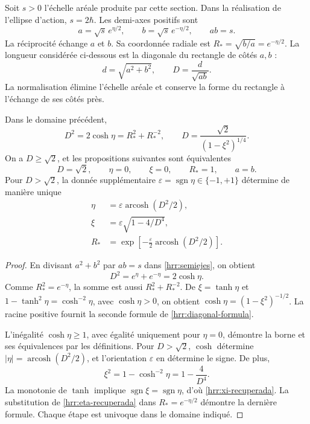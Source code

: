 Soit \(s>0\) l’échelle aréale produite par cette section. Dans la réalisation de l’ellipse d’action, \(s=2\hbar\). Les demi-axes positifs sont
\begin{equation}
 a=\sqrt{s}\,e^{\eta/2},\qquad
 b=\sqrt{s}\,e^{-\eta/2},\qquad ab=s.
 \label{hrr:semiejes}
\end{equation}
La réciprocité échange \(a\) et \(b\). Sa coordonnée radiale est \(R_*=\sqrt{b/a}=e^{-\eta/2}\). La longueur considérée ci-dessous est la diagonale du rectangle de côtés \(a,b\) :
\[
 d=\sqrt{a^2+b^2},\qquad D=\frac{d}{\sqrt{ab}}.
\]
La normalisation élimine l’échelle aréale et conserve la forme du rectangle à l’échange de ses côtés près.

\begin{theorem}
\label{hrr:diagonal-teorema} Dans le domaine précédent,
\begin{equation}
 D^2=2\cosh\eta=R_*^2+R_*^{-2},
 \qquad
 D=\frac{\sqrt2}{(1-\xi^2)^{1/4}}.
 \label{hrr:diagonal-formula}
\end{equation}
On a \(D\geq\sqrt2\), et les propositions suivantes sont équivalentes
\[
 D=\sqrt2,\qquad \eta=0,\qquad \xi=0,\qquad R_*=1,
 \qquad a=b.
\]
Pour \(D>\sqrt2\), la donnée supplémentaire \(\varepsilon=\operatorname{sgn}\eta\in\{-1,+1\}\) détermine de manière unique
\begin{align}
 \eta&=\varepsilon\operatorname{arcosh}(D^2/2),
 \label{hrr:eta-recuperada}\\
 \xi&=\varepsilon\sqrt{1-4/D^4},
 \label{hrr:xi-recuperada}\\
 R_*&=\exp\!\left[-\frac{\varepsilon}{2}
                   \operatorname{arcosh}(D^2/2)\right].
 \label{hrr:radio-recuperado}
\end{align}
\end{theorem}
\begin{proof}
En divisant \(a^2+b^2\) par \(ab=s\) dans \eqref{hrr:semiejes}, on obtient
\[
 D^2=e^{\eta}+e^{-\eta}=2\cosh\eta.
\]
Comme \(R_*^2=e^{-\eta}\), la somme est aussi \(R_*^2+R_*^{-2}\). De \(\xi=\tanh\eta\) et \(1-\tanh^2\eta=\cosh^{-2}\eta\), avec \(\cosh\eta>0\), on obtient \(\cosh\eta=(1-\xi^2)^{-1/2}\). La racine positive fournit la seconde formule de \eqref{hrr:diagonal-formula}.

L’inégalité \(\cosh\eta\geq1\), avec égalité uniquement pour \(\eta=0\), démontre la borne et ses équivalences par les définitions. Pour \(D>\sqrt2\), \(\cosh\) détermine \(|\eta|=\operatorname{arcosh}(D^2/2)\), et l’orientation \(\varepsilon\) en détermine le signe. De plus,
\[
 \xi^2=1-\cosh^{-2}\eta=1-\frac4{D^4}.
\]
La monotonie de \(\tanh\) implique \(\operatorname{sgn}\xi=\operatorname{sgn}\eta\), d’où \eqref{hrr:xi-recuperada}. La substitution de \eqref{hrr:eta-recuperada} dans \(R_*=e^{-\eta/2}\) démontre la dernière formule. Chaque étape est univoque dans le domaine indiqué.
\end{proof}

